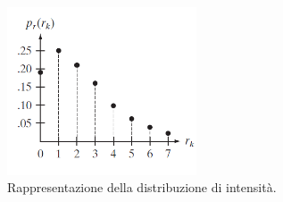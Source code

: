\documentclass[a4paper]{article}
\begin{document}
	\begin{figure}[!htp]
		\centering
		\includegraphics[width=0.5\textwidth]{img/eg_equalizzazione.png}
		\caption*{Rappresentazione della distribuzione di intensità.}
	\end{figure}
	
\end{document}
